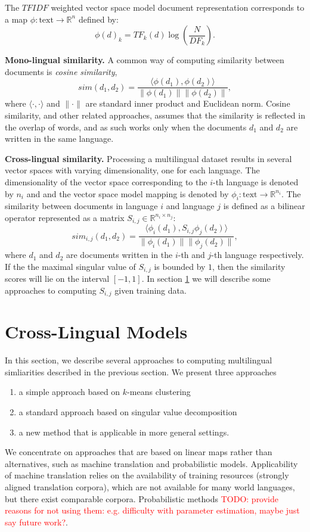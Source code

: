 \documentclass[twoside,11pt]{article}
\newcommand{\todo}[1]{\textcolor{red}{TODO: #1}}
\newcommand{\RR}{\mathbb{R}}
\begin{document}
The $TFIDF$ weighted vector space model document representation corresponds to a map $\phi : \text{text} \rightarrow \RR^n$ defined by:
$$\phi(d)_k = {TF}_k(d) \log\left( \frac{N}{{DF}_k}\right).$$

\textbf {Mono-lingual similarity.}
A common way of computing similarity between documents is \emph{cosine similarity},
$$sim(d_1, d_2) = \frac{\langle \phi(d_1), \phi(d_2)\rangle}{\|\phi(d_1)\| \|\phi(d_2)\|},$$
where $\langle \cdot,\cdot \rangle$ and $\|\cdot\|$ are standard inner product and Euclidean norm. Cosine similarity, and other related approaches, assumes that the similarity is reflected in the overlap of words, and as such works only when the documents $d_1$ and $d_2$ are written in the same language.

\textbf {Cross-lingual similarity.}
Processing a multilingual dataset results in several vector spaces with varying dimensionality, one for each language. The dimensionality of the vector space corresponding to the $i$-th language is denoted by $n_i$ and and the vector space model mapping is denoted by $\phi_i : \text{text} \rightarrow \RR^{n_i}$.
The similarity between documents in language $i$ and language $j$ is defined as a bilinear operator represented as a matrix $S_{i,j} \in \RR^{n_i \times n_j}$:
$$sim_{i,j}(d_1, d_2) = \frac{ \langle \phi_i (d_1), S_{i,j} \phi_j (d_2) \rangle }{\|\phi_i(d_1)\| \|\phi_j(d_2)\|},$$
where $d_1$ and $d_2$ are documents written in the $i$-th and $j$-th language respectively. If the the maximal singular value of $S_{i,j}$ is bounded by $1$, then the similarity scores will lie on the interval $[-1, 1]$. In section \ref{sec:models} we will describe some approaches to computing $S_{i,j}$ given training data.

\section{Cross-Lingual Models}\label{sec:models}
In this section, we describe several approaches to computing multilingual simliarities described in the previous section. We present three approaches
\begin{enumerate}
\item  a simple approach based on $k$-means clustering
\item  a standard approach based on singular value decomposition
\item a new method that is applicable in more general settings.
\end{enumerate}
 We concentrate on approaches that are based on linear maps rather than alternatives, such as machine translation and probabilistic models. Applicability of machine translation relies
on the availability of training resources (strongly aligned translation corpora), which are not available for many world languages, but there exist comparable corpora. Probabilistic
methods \todo{provide reasons for not using them: e.g. difficulty with parameter estimation, maybe just say future work?}.
\end{document}
